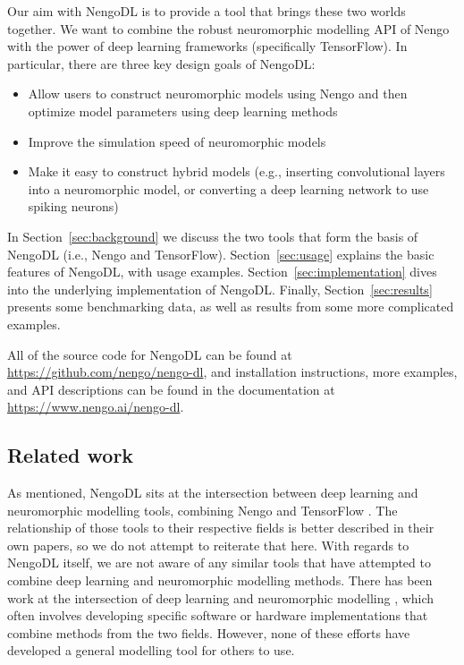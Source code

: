 \documentclass{article}
\begin{document}
Our aim with NengoDL is to provide a tool that brings these two worlds together.  We want to combine the robust neuromorphic modelling API of Nengo with the power of deep learning frameworks (specifically TensorFlow).  In particular, there are three key design goals of NengoDL:

\begin{itemize}
\item Allow users to construct neuromorphic models using Nengo and then optimize model parameters using deep learning methods
\item Improve the simulation speed of neuromorphic models
\item Make it easy to construct hybrid models (e.g., inserting convolutional layers into a neuromorphic model, or converting a deep learning network to use spiking neurons)
\end{itemize}

In Section~\ref{sec:background} we discuss the two tools that form the basis of NengoDL (i.e., Nengo and TensorFlow).  Section~\ref{sec:usage} explains the basic features of NengoDL, with usage examples.  Section~\ref{sec:implementation} dives into the underlying implementation of NengoDL.  Finally, Section~\ref{sec:results} presents some benchmarking data, as well as results from some more complicated examples.

All of the source code for NengoDL can be found at \url{https://github.com/nengo/nengo-dl}, and installation instructions, more examples, and API descriptions can be found in the documentation at \url{https://www.nengo.ai/nengo-dl}.

\subsection{Related work}

As mentioned, NengoDL sits at the intersection between deep learning and neuromorphic modelling tools, combining Nengo \citep{Bekolay2014} and TensorFlow \citep{Abadi2016}.  The relationship of those tools to their respective fields is better described in their own papers, so we do not attempt to reiterate that here.  With regards to NengoDL itself, we are not aware of any similar tools that have attempted to combine deep learning and neuromorphic modelling methods.  There has been work at the intersection of deep learning and neuromorphic modelling \citep[e.g.,][]{Esser2015,Hunsberger2016,Kriegeskorte2015,Yamins2016,Lee2016}, which often involves developing specific software or hardware implementations that combine methods from the two fields. However, none of these efforts have developed a general modelling tool for others to use.
\end{document}
